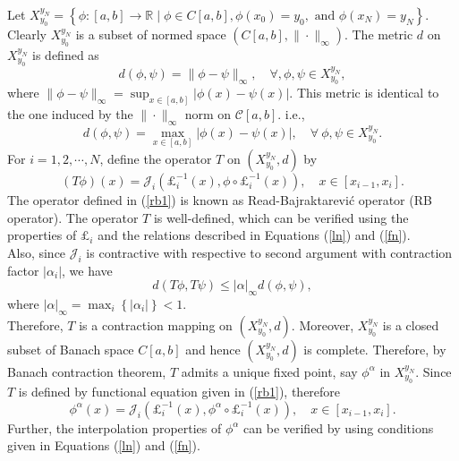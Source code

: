 \documentclass{article}[12pt, a4]
\begin{document}
	Let \(X_{y_0}^{y_N} = \left\{\phi: [a,b] \to \mathbb{R} \mid \phi\in C[a,b], \phi(x_0) = y_0, \text{ and } \phi(x_N) = y_N\right\}\). Clearly $X_{y_0}^{y_N}$ is a subset of normed space $\left(C[a,b], \|\cdot\|_\infty\right)$. The metric $d$ on $X_{y_0}^{y_N}$ is defined as  
	\[
	d(\phi, \psi) = \|\phi - \psi\|_\infty, \quad \forall ,\phi, \psi \in X_{y_0}^{y_N},
	\]
	where $\|\phi - \psi\|_\infty =\displaystyle\sup_{x \in [a, b]} |\phi(x) - \psi(x)|$. This metric is identical to the one induced by the $\|\cdot\|_\infty$ norm on $\mathcal{C}[a, b]$.
	i.e., 
	\begin{equation*}
		d(\phi, \psi) = \underset{x\in [a,b]}{\max}\left|\phi(x) - \psi(x)\right|,\quad\forall~ \phi , \psi \in X_{y_0}^{y_N}.
	\end{equation*} 
	For $i =1,2,\cdots,N$, define the operator $T$ on $(X_{y_0}^{y_N}, d)$ by
	\begin{equation}\label{rb1}
		(T \phi)(x)=\mathcal{J}_{i}\left(\pounds_{i}^{-1}(x), \phi \circ \pounds_{i}^{-1}(x)\right), \quad x \in [x_{i-1},x_{i}].
	\end{equation}
	The operator defined in (\ref{rb1}) is known as Read-Bajraktarević operator (RB operator). The operator \( T \) is well-defined, which can be verified using the properties of \( \pounds_i \) and the relations described in Equations (\ref{ln}) and (\ref{fn}).\\
	Also, since $\mathcal{J}_i$ is contractive with respective to second argument with contraction factor $|\alpha_{i}|$, we have 
	\begin{equation*}
		d(T \phi, T \psi) \leq|\alpha|_{\infty} d(\phi, \psi),
	\end{equation*}
	where $\displaystyle|\alpha|_{\infty}=\max_{i} \left\{\left|\alpha_{i}\right|\right\}<1$.\\
	Therefore, \(T\) is a contraction mapping on \((X_{y_0}^{y_N}, d)\). Moreover, $X_{y_0}^{y_N}$ is a closed subset of Banach space $C[a,b]$ and hence $(X_{y_0}^{y_N},d)$ is complete. Therefore, by Banach contraction theorem, \(T\) admits a unique fixed point, say \(\phi^{\alpha}\) in \(X_{y_0}^{y_N}\). Since $T$ is defined by functional equation given in  (\ref{rb1}), therefore
	\begin{equation*}
		\phi^{\alpha}(x) = \mathcal{J}_{i}\left(\pounds_i^{-1}(x), \phi^{\alpha} \circ \pounds_i^{-1}(x)\right), \quad x \in [x_{i-1}, x_{i}]. 
	\end{equation*} 
	Further, the interpolation properties of $\phi^{\alpha}$ can be verified by using conditions given in Equations (\ref{ln}) and (\ref{fn}).  
	
\end{document}

